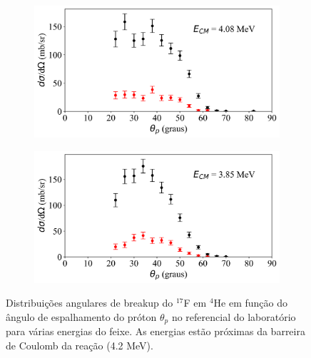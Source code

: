 \documentclass[a4paper,12pt,oneside]{book}
\begin{document}
\begin{figure}[H]
\begin{subfigure}[b]{0.48\textwidth}
        \caption{}
        \label{subfig:dist_ang_j}
    \end{subfigure}%
    \hfill
    \begin{subfigure}[b]{0.49\textwidth}
        \centering
        \includegraphics[scale=0.38, width=1.\columnwidth]{figs/dist_angs/dist_ang_10.png}
        \caption{}
        \label{subfig:dist_ang_k}
    \end{subfigure}
    \begin{subfigure}[b]{0.48\textwidth}
        \centering
        \includegraphics[scale=0.38, width=1.\columnwidth]{figs/dist_angs/dist_ang_11.png}
        \caption{}
        \label{subfig:dist_ang_l}
    \end{subfigure}%
    \hfill
\caption{Distribuições angulares de breakup do $^{17}$F em $^4$He em função do ângulo de espalhamento do próton $\theta_p$ no referencial do laboratório para várias energias do feixe. As energias estão próximas da barreira de Coulomb da reação (4.2 MeV).}
\label{fig:dist_ang_prox}
\end{figure}
\end{document}
